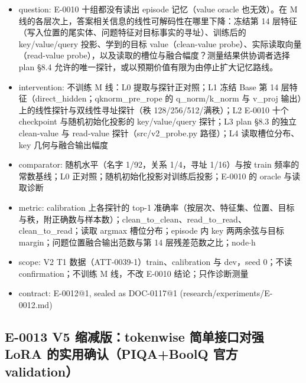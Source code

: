 \documentclass[11pt]{article}
\begin{document}
\begin{itemize}
\item question: E-0010 十组都没有读出 episode 记忆（value oracle 也无效）。在 M 线的各层次上，答案相关信息的线性可解码性在哪里下降：冻结第 14 层特征（写入位置的尾实体、问题特征对目标事实的寻址）、训练后的 key/value/query 投影、学到的目标 value（clean-value probe）、实际读取向量（read-value probe），以及读取的槽位与融合幅度？测量结果供协调者选择 plan §8.4 允许的唯一探针，或以预期价值有限为由停止扩大记忆路线。
\item intervention: 不训练 M 线：L0 提取与探针正对照；L1 冻结 Base 第 14 层特征（direct\_hidden；qknorm\_pre\_rope 的 q\_norm/k\_norm 与 v\_proj 输出）上的线性探针与双线性寻址探针（秩 128/256/512/满秩）；L2 E-0010 十个 checkpoint 与随机初始化投影的 key/value/query 探针；L3 plan §8.3 的独立 clean-value 与 read-value 探针（src/v2\_probe.py 路径）；L4 读取槽位分布、key 几何与融合输出幅度
\item comparator: 随机水平（名字 1/92，关系 1/4，寻址 1/16）与按 train 频率的常数基线；L0 正对照；随机初始化投影对训练后投影；E-0010 的 oracle 与读取诊断
\item metric: calibration 上各探针的 top-1 准确率（按层次、特征集、位置、目标与秩，附正确数与样本数）；clean\_to\_clean、read\_to\_read、clean\_to\_read；读取 argmax 槽位分布；episode 内 key 两两余弦与目标 margin；问题位置融合输出范数与第 14 层残差范数之比；node\ensuremath{\cdot}h
\item scope: V2 T1 数据（ATT-0039-1）train、calibration 与 dev，seed 0；不读 confirmation；不训练 M 线，不改 E-0010 结论；只作诊断测量
\item contract: E-0012@1, sealed as DOC-0117@1 (research/experiments/E-0012.md)
\end{itemize}

\subsection*{E-0013 V5 缩减版：tokenwise 简单接口对强 LoRA 的实用确认（PIQA+BoolQ 官方 validation）}
\end{document}
